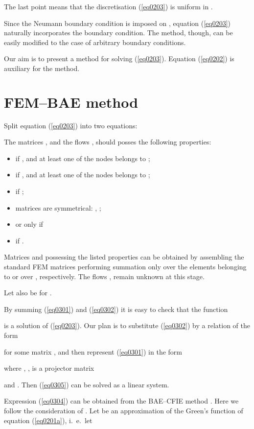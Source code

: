 \documentclass[12pt]{article}
\begin{document}
The last point means that the discretisation (\ref{eq0203})
is uniform in .

Since the Neumann boundary condition is imposed on , equation (\ref{eq0203}) naturally incorporates the
boundary condition. The method, though, can be easily modified to the case of arbitrary boundary conditions.

Our aim is to present a method for solving (\ref{eq0203}). Equation (\ref{eq0202}) is auxiliary for the method.



\section{FEM--BAE method}
\label{sec:method}

Split equation (\ref{eq0203}) into two equations:


The matrices ,  and the flows ,
 should posses the following properties:
\begin{itemize}
\item
 if , and at least one of the nodes
 belongs to ;
\item
 if , and at least one of the nodes
 belongs to ;
\item
 if  ;
\item
matrices are symmetrical: ,
;
\item
 or  only if 
\item
 if .
\end{itemize}

Matrices  and  possessing the listed properties can be obtained by
assembling the standard FEM matrices performing summation only over the elements belonging to 
or over , respectively. The flows ,
 remain unknown at this stage.

Let also be  for .

By summing (\ref{eq0301}) and (\ref{eq0302})
it is easy to check that the function

is a solution of (\ref{eq0203}). Our plan is to substitute (\ref{eq0302}) by a relation of the form

for some matrix , and then represent (\ref{eq0301}) in the form

where , ,    is a projector matrix

and . Then (\ref{eq0305}) can be solved as a linear system.

Expression (\ref{eq0304}) can be obtained from the BAE--CFIE method \cite{poblet-PVS:2015}.
Here we follow the consideration of \cite{poblet-PVS:2015}.
Let  be an approximation of the Green's function of equation (\ref{eq0201a}), i.\ e.\ let
\end{document}

